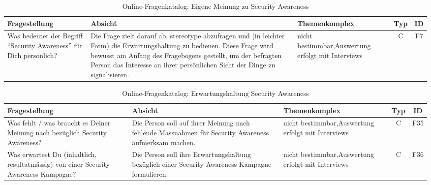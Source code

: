 \documentclass[../../main.tex]{subfiles}
\begin{document}

\sloppy 

\begin{table}[H]
\tablefontsize	
\centering
\caption{Online-Fragenkatalog: Eigene Meinung zu Security Awareness}
\label{Eigene Meinung zu Security Awareness}
\begin{tabular}{ |p{5.5cm}|p{5.5cm}|p{2.5cm}|c|c|}

\hline
\tableheaderbgcolor
\textbf{Fragestellung} & \textbf{Absicht} & \textbf{Themenkomplex} & \textbf{Typ} & \textbf{ID}\\ 
\hline
Was bedeutet der Begriff "`Security Awareness"' für Dich persönlich? &  Die Frage zielt darauf ab, stereotype abzufragen und (in leichter Form) die Erwartungshaltung zu bedienen. Diese Frage wird bewusst am Anfang des Fragebogens gestellt, um der befragten Person das Interesse an ihrer persönlichen Sicht der Dinge zu signalisieren. & nicht bestimmbar,\newline Auswertung erfolgt mit Interviews & C & F7 \\
\hline

\end{tabular}
\end{table}


\sloppy 

\begin{table}[H]
\tablefontsize	
\centering
\caption{Online-Fragenkatalog: Erwartungshaltung Security Awareness}
\label{Erwartungshaltung Security Awareness}
\begin{tabular}{ |p{5.5cm}|p{5.5cm}|p{2.5cm}|c|c|}

\hline
\tableheaderbgcolor
\textbf{Fragestellung} & \textbf{Absicht} & \textbf{Themenkomplex} & \textbf{Typ} & \textbf{ID}\\ 
\hline
Was fehlt / was braucht es Deiner Meinung nach bezüglich Security Awareness? & Die Person soll auf ihrer Meinung nach fehlende Massnahmen für Security Awareness aufmerksam machen. & nicht bestimmbar,\newline Auswertung erfolgt mit Interviews & C & F35 \\
\hline

Was erwartest Du (inhaltlich, resultatmässig) von einer Security Awareness Kampagne? & Die Person soll ihre Erwartungshaltung bezüglich einer Security Awareness Kampagne formulieren. & nicht bestimmbar,\newline Auswertung erfolgt mit Interviews & C & F36 \\
\hline

\end{tabular}
\end{table}
\end{document}
